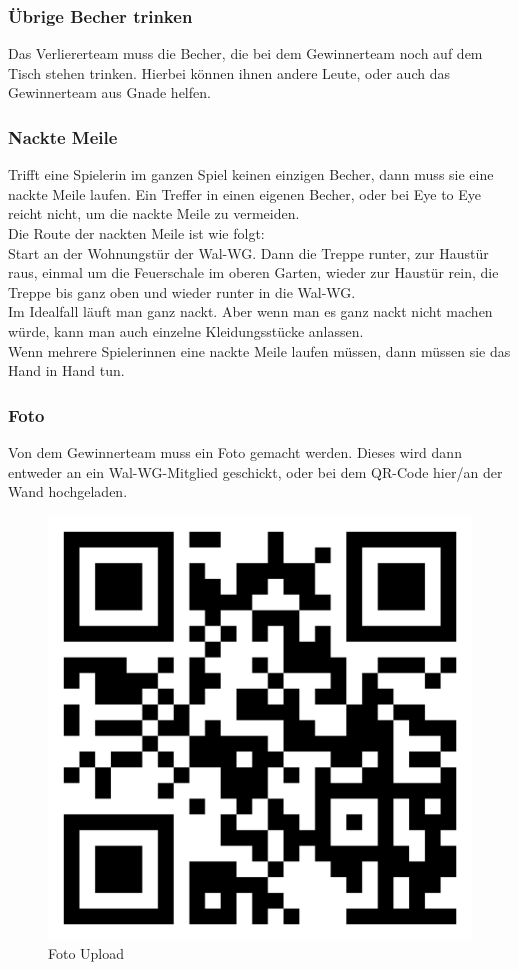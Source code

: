 \documentclass[a5paper, 12pt]{book}
\begin{document}
\subsubsection{Übrige Becher trinken}\label{übrigebechertrinken}
Das Verliererteam muss die Becher, die bei dem Gewinnerteam noch auf dem Tisch stehen trinken. Hierbei können ihnen andere Leute, oder auch das Gewinnerteam aus Gnade helfen.
\subsubsection{Nackte Meile}\label{nacktemeile}
Trifft eine Spielerin im ganzen Spiel keinen einzigen Becher, dann muss sie eine nackte Meile laufen. Ein Treffer in einen eigenen Becher, oder bei Eye to Eye reicht nicht, um die nackte Meile zu vermeiden.\\
Die Route der nackten Meile ist wie folgt:\\
Start an der Wohnungstür der Wal-WG\texttrademark. Dann die Treppe runter, zur Haustür raus, einmal um die Feuerschale im oberen Garten, wieder zur Haustür rein, die Treppe bis ganz oben und wieder runter in die Wal-WG\texttrademark.\\
Im Idealfall läuft man ganz nackt. Aber wenn man es ganz nackt nicht machen würde, kann man auch einzelne Kleidungsstücke anlassen.\\
Wenn mehrere Spielerinnen eine nackte Meile laufen müssen, dann müssen sie das Hand in Hand tun. 

\subsubsection{Foto}\label{foto}
Von dem Gewinnerteam muss ein Foto gemacht werden. Dieses wird dann entweder an ein Wal-WG\texttrademark-Mitglied geschickt, oder bei dem QR-Code hier/an der Wand hochgeladen.\\ 
\begin{figure}[htbt]
    \centering
    \includegraphics[scale = 0.1]{bilder}
    \caption{Foto Upload}
    \label{fig:fotoupload}
\end{figure}
\end{document}
